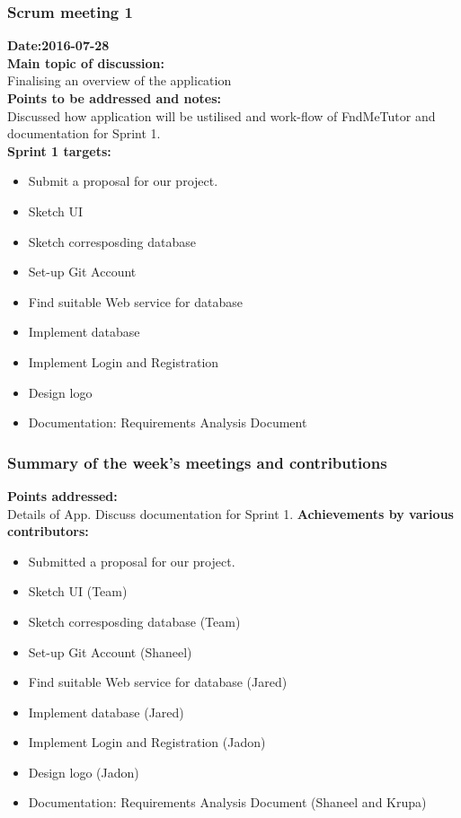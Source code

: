 \documentclass[12pt]{article}
\begin{document}
\subsubsection{Scrum meeting 1}
\textbf{Date:2016-07-28}\\
\textbf{Main topic of discussion:}\\
Finalising an overview of the application\\
\textbf{Points to be addressed and notes:}\\
Discussed how application will be ustilised and work-flow of FndMeTutor and documentation for Sprint 1.\\
\textbf{Sprint 1 targets:} \\
\begin{itemize}
\item Submit a proposal for our project.
\item Sketch UI
\item Sketch corresposding database
\item Set-up Git Account
\item Find suitable Web service for database
\item Implement database
\item Implement Login and Registration
\item Design logo
\item Documentation: Requirements Analysis Document
\end{itemize}

\subsubsection{Summary of the week's meetings and contributions}
\textbf{Points addressed:} \\
Details of App. Discuss documentation for Sprint 1.
\textbf{Achievements by various contributors:}
\begin{itemize}
\item Submitted a proposal for our project.
\item Sketch UI (Team)
\item Sketch corresposding database (Team)
\item Set-up Git Account (Shaneel)
\item Find suitable Web service for database (Jared)
\item Implement database (Jared)
\item Implement Login and Registration (Jadon)
\item Design logo (Jadon)
\item Documentation: Requirements Analysis Document (Shaneel and Krupa)
\end{itemize}
\end{document}
